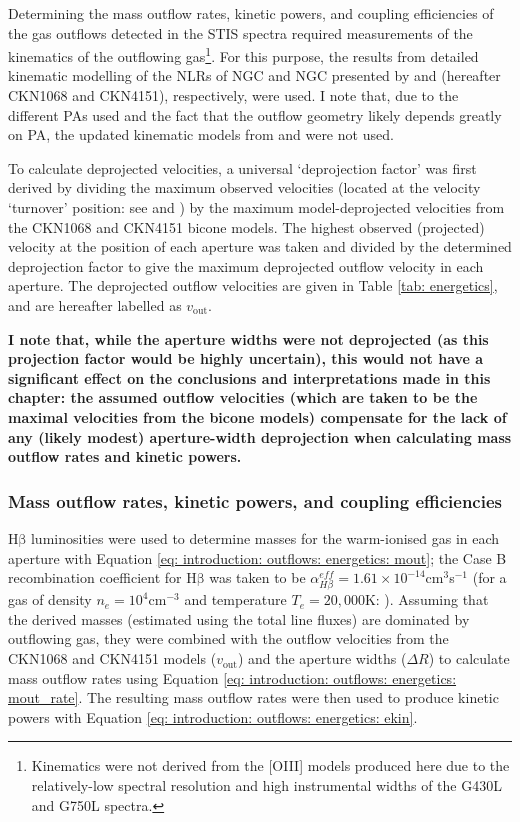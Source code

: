 Determining the mass outflow rates, kinetic powers, and coupling efficiencies of the gas outflows detected in the STIS spectra required measurements of the kinematics of the outflowing gas\footnote{Kinematics were not derived from the [OIII] models produced here due to the relatively-low spectral resolution and high instrumental widths of the G430L and G750L spectra.}. For this purpose, the results from detailed kinematic modelling of the NLRs of NGC and NGC presented by \citet{Crenshaw2000_N1068} and \citet{Crenshaw2000_N4151} (hereafter CKN1068 and CKN4151), respectively, were used. I note that, due to the different PAs used and the fact that the outflow geometry likely depends greatly on PA, the updated kinematic models from \citet{Das2005} and \citet{Das2006} were not used. 

To calculate deprojected velocities, a universal `deprojection factor' was first derived by dividing the maximum observed velocities (located at the velocity `turnover' position: see \citealt{Crenshaw2000_N1068} and \citealt{Crenshaw2000_N4151}) by the maximum model-deprojected velocities from the CKN1068 and CKN4151 bicone models. The highest observed (projected) velocity at the position of each aperture was taken and divided by the determined deprojection factor to give the maximum deprojected outflow velocity in each aperture. The deprojected outflow velocities are given in Table \ref{tab: energetics}, and are hereafter labelled as $v_\mathrm{out}$. 

\textbf{I note that, while the aperture widths were not deprojected (as this projection factor would be highly uncertain), this would not have a significant effect on the conclusions and interpretations made in this chapter: the assumed outflow velocities (which are taken to be the maximal velocities from the bicone models) compensate for the lack of any (likely modest) aperture-width deprojection when calculating mass outflow rates and kinetic powers.}

\subsubsection{Mass outflow rates, kinetic powers, and coupling efficiencies}
\label{section: stis_seyferts: mout_ekin_fkin}

H$\mathrm{\beta}$ luminosities were used to determine masses for the warm-ionised gas in each aperture with Equation \ref{eq: introduction: outflows: energetics: mout}; the Case B recombination coefficient for H$\mathrm{\beta}$ was taken to be $\alpha^{eff}_{H\beta}=1.61\times10^{-14}$\;cm$^3$\;s$^{-1}$ (for a gas of density $n_e=10^4$\;cm$^{-3}$ and temperature $T_e=20,000$\;K: \citealt{Osterbrock2006}). Assuming that the derived masses (estimated using the total line fluxes) are dominated by outflowing gas, they were combined with the outflow velocities from the CKN1068 and CKN4151 models ($v_\mathrm{out}$) and the aperture widths ($\Delta R$) to calculate mass outflow rates using Equation \ref{eq: introduction: outflows: energetics: mout_rate}. The resulting mass outflow rates were then used to produce kinetic powers with Equation \ref{eq: introduction: outflows: energetics: ekin}.

